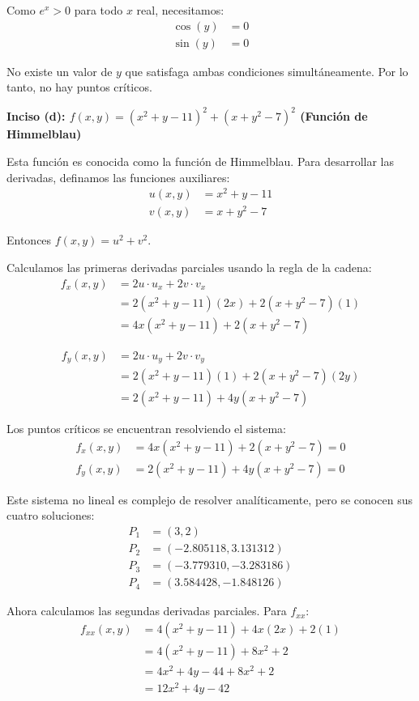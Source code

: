 \documentclass{article}
\begin{document}
Como $e^x > 0$ para todo $x$ real, necesitamos:
\begin{align}
\cos(y) &= 0 \\
\sin(y) &= 0
\end{align}

No existe un valor de $y$ que satisfaga ambas condiciones simultáneamente. Por lo tanto, no hay puntos críticos.

\textbf{Inciso (d): $f(x,y) = (x^{2} + y - 11)^{2} + (x + y^{2} - 7)^{2}$ (Función de Himmelblau)}

Esta función es conocida como la función de Himmelblau. Para desarrollar las derivadas, definamos las funciones auxiliares:
\begin{align}
u(x,y) &= x^2 + y - 11 \\
v(x,y) &= x + y^2 - 7
\end{align}

Entonces $f(x,y) = u^2 + v^2$.

Calculamos las primeras derivadas parciales usando la regla de la cadena:
\begin{align}
f_x(x,y) &= 2u \cdot u_x + 2v \cdot v_x \\
&= 2(x^2 + y - 11)(2x) + 2(x + y^2 - 7)(1) \\
&= 4x(x^2 + y - 11) + 2(x + y^2 - 7)
\end{align}

\begin{align}
f_y(x,y) &= 2u \cdot u_y + 2v \cdot v_y \\
&= 2(x^2 + y - 11)(1) + 2(x + y^2 - 7)(2y) \\
&= 2(x^2 + y - 11) + 4y(x + y^2 - 7)
\end{align}

Los puntos críticos se encuentran resolviendo el sistema:
\begin{align}
f_x(x,y) &= 4x(x^2 + y - 11) + 2(x + y^2 - 7) = 0 \\
f_y(x,y) &= 2(x^2 + y - 11) + 4y(x + y^2 - 7) = 0
\end{align}

Este sistema no lineal es complejo de resolver analíticamente, pero se conocen sus cuatro soluciones:
\begin{align}
P_1 &= (3, 2) \\
P_2 &= (-2.805118, 3.131312) \\
P_3 &= (-3.779310, -3.283186) \\
P_4 &= (3.584428, -1.848126)
\end{align}

Ahora calculamos las segundas derivadas parciales. Para $f_{xx}$:
\begin{align}
f_{xx}(x,y) &= 4(x^2 + y - 11) + 4x(2x) + 2(1) \\
&= 4(x^2 + y - 11) + 8x^2 + 2 \\
&= 4x^2 + 4y - 44 + 8x^2 + 2 \\
&= 12x^2 + 4y - 42
\end{align}
\end{document}
